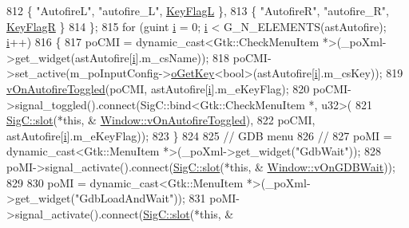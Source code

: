 \begin{DoxyCode}
{{{812     \{ \textcolor{stringliteral}{"AutofireL"}, \textcolor{stringliteral}{"autofire\_L"}, \mbox{\hyperlink{class_v_b_a_a20a8479ee93dc52b1fbd911a13cb30a5ad04b7c8e1cf8bb6053010c681bfa253d}{KeyFlagL}} \},
813     \{ \textcolor{stringliteral}{"AutofireR"}, \textcolor{stringliteral}{"autofire\_R"}, \mbox{\hyperlink{class_v_b_a_a20a8479ee93dc52b1fbd911a13cb30a5ae74198fb73e9b0d06aca1dedcac42732}{KeyFlagR}} \}
814   \};
815   \textcolor{keywordflow}{for} (guint \mbox{\hyperlink{expr-lex_8cpp_acb559820d9ca11295b4500f179ef6392}{i}} = 0; \mbox{\hyperlink{expr-lex_8cpp_acb559820d9ca11295b4500f179ef6392}{i}} < G\_N\_ELEMENTS(astAutofire); \mbox{\hyperlink{expr-lex_8cpp_acb559820d9ca11295b4500f179ef6392}{i}}++)
816   \{
817     poCMI = \textcolor{keyword}{dynamic\_cast<}Gtk::CheckMenuItem *\textcolor{keyword}{>}(\_poXml->get\_widget(astAutofire[\mbox{\hyperlink{expr-lex_8cpp_acb559820d9ca11295b4500f179ef6392}{i}}].m\_csName));
818     poCMI->set\_active(m\_poInputConfig->\mbox{\hyperlink{class_v_b_a_1_1_config_1_1_section_ab169d7aae4e9dde91418ba1668e3ad39}{oGetKey}}<\textcolor{keywordtype}{bool}>(astAutofire[\mbox{\hyperlink{expr-lex_8cpp_acb559820d9ca11295b4500f179ef6392}{i}}].m\_csKey));
819     \mbox{\hyperlink{class_v_b_a_1_1_window_a7267bdc270816ef841f3fe1bcfd03f27}{vOnAutofireToggled}}(poCMI, astAutofire[\mbox{\hyperlink{expr-lex_8cpp_acb559820d9ca11295b4500f179ef6392}{i}}].m\_eKeyFlag);
820     poCMI->signal\_toggled().connect(SigC::bind<Gtk::CheckMenuItem *, u32>(
821                                       \mbox{\hyperlink{namespace_sig_c_a92e4f19202b77e78ac1db05f5a62f6b6}{SigC::slot}}(*\textcolor{keyword}{this}, &
      \mbox{\hyperlink{class_v_b_a_1_1_window_a7267bdc270816ef841f3fe1bcfd03f27}{Window::vOnAutofireToggled}}),
822                                       poCMI, astAutofire[\mbox{\hyperlink{expr-lex_8cpp_acb559820d9ca11295b4500f179ef6392}{i}}].m\_eKeyFlag));
823   \}
824 
825   \textcolor{comment}{// GDB menu}
826   \textcolor{comment}{//}
827   poMI = \textcolor{keyword}{dynamic\_cast<}Gtk::MenuItem *\textcolor{keyword}{>}(\_poXml->get\_widget(\textcolor{stringliteral}{"GdbWait"}));
828   poMI->signal\_activate().connect(\mbox{\hyperlink{namespace_sig_c_a92e4f19202b77e78ac1db05f5a62f6b6}{SigC::slot}}(*\textcolor{keyword}{this}, &
      \mbox{\hyperlink{class_v_b_a_1_1_window_a35c038f07a5ea91103c5e05b82b8bd0b}{Window::vOnGDBWait}}));
829 
830   poMI = \textcolor{keyword}{dynamic\_cast<}Gtk::MenuItem *\textcolor{keyword}{>}(\_poXml->get\_widget(\textcolor{stringliteral}{"GdbLoadAndWait"}));
831   poMI->signal\_activate().connect(\mbox{\hyperlink{namespace_sig_c_a92e4f19202b77e78ac1db05f5a62f6b6}{SigC::slot}}(*\textcolor{keyword}{this}, &
}}}
\end{DoxyCode}
